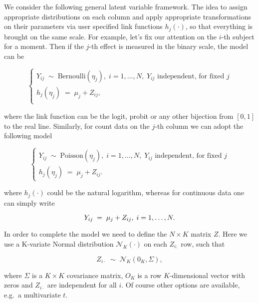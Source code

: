 \documentclass[11pt]{article}
\begin{document}
We consider the following general latent variable framework. The idea to
assign appropriate distributions on each column and apply appropriate
transformations on their parameters via user specified link functions
\(h_{j}(\cdot)\), so that everything is brought on the same scale. For
example, let's fix our attention on the \(i\)-th subject for a moment.
Then if the \(j\)-th effect is measured in the binary scale, the model
can be

\begin{equation}
\label{eq:binary}
\begin{cases}
Y_{ij}\; \sim\; \text{Bernoulli}(\eta_j),\;i=1,\dots,N,\;Y_{ij} \text{ independent, for fixed } j\\
h_{j}(\eta_j) \; = \; \mu_j + Z_{ij},\\
\end{cases}
\end{equation}

where the link function can be the logit, probit or any other bijection
from \([0, 1]\) to the real line. Similarly, for count data on the
\(j\)-th column we can adopt the following model

\begin{equation}
\label{eq:counts}
\begin{cases}
Y_{ij}\; \sim\; \text{Poisson}(\eta_j),\;i=1,\dots,N,\;Y_{ij} \text{ independent, for fixed } j\\
h_{j}(\eta_j) \; = \; \mu_j + Z_{ij}. 
\end{cases}
\end{equation}

where \(h_{j}(\cdot)\) could be the natural logarithm, whereas for
continuous data one can simply write

\begin{equation}
\label{eq:contain}
Y_{ij}\; = \; \mu_j + Z_{ij},\;i=1,\dots,N.\\
\end{equation}

In order to complete the model we need to define the \(N\times K\)
matrix \(Z\). Here we use a K-variate Normal distribution
\(\mathcal{N}_K(\cdot)\) on each \(Z_{i :}\) row, such that

\begin{equation}
\label{eq:Zdist}
Z_{i\cdot} \;\sim\; \mathcal{N}_{K}(0_{K},\Sigma),
\end{equation}

where \(\Sigma\) is a \(K\times K\) covariance matrix, \(O_{K}\) is a
row \(K\)-dimensional vector with zeros and \(Z_{i\cdot}\) are
independent for all \(i\). Of course other options are available, e.g.~a
multivariate \(t\).
\end{document}
